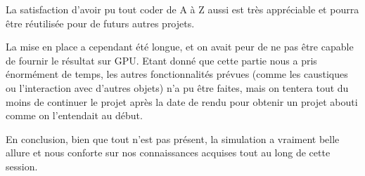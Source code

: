 \documentclass[a4paper,11pt,leqno]{article}
\begin{document}
La satisfaction d'avoir pu tout coder de A à Z aussi est très appréciable et pourra être réutilisée pour de futurs autres projets.

La mise en place a cependant été longue, et on avait peur de ne pas être capable de fournir le résultat sur GPU. Etant donné que cette partie nous a pris énormément de temps, les autres fonctionnalités prévues (comme les caustiques ou l'interaction avec d'autres objets) n'a pu être faites, mais on tentera tout du moins de continuer le projet après la date de rendu pour obtenir un projet abouti comme on l'entendait au début.

En conclusion, bien que tout n'est pas présent, la simulation a vraiment belle allure et nous conforte sur nos connaissances acquises tout au long de cette session.
\end{document}
